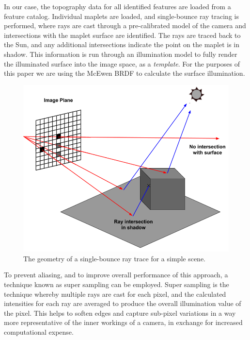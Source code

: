 \documentclass{RPI-SIW}
\begin{document}
In our case, the topography data for all identified features are loaded from a feature catalog.  Individual maplets are loaded, and single-bounce ray tracing is performed, where rays are cast through a pre-calibrated model of the camera and intersections with the maplet surface are identified.  The rays are traced back to the Sun, and any additional intersections indicate the point on the maplet is in shadow.  This information is run through an illumination model to fully render the illuminated surface into the image space, as a \textit{template}.  For the purposes of this paper we are using the McEwen BRDF to calculate the surface illumination.\cite{mcewen}
\begin{figure}
	\centering
	\includegraphics[width=\columnwidth]{ray_tracing.png}
	\caption{The geometry of a single-bounce ray trace for a simple scene.}
	\label{figs::ray_tracing}
\end{figure}

To prevent aliasing, and to improve overall performance of this approach, a technique known as super sampling can be employed.  Super sampling is the technique whereby multiple rays are cast for each pixel, and the calculated intensities for each ray are averaged to produce the overall illumination value of the pixel.  This helps to soften edges and capture sub-pixel variations in a way more representative of the inner workings of a camera, in exchange for increased computational expense.
\end{document}
